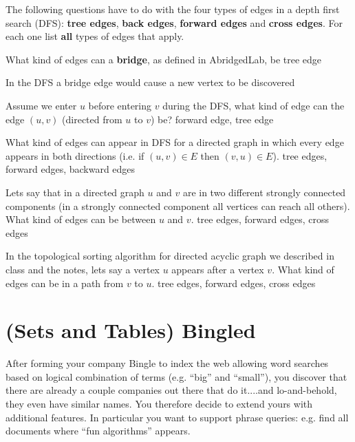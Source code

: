 \begin{problem}
%

The following questions have to do with the four types of edges in
a depth first search (DFS): \textbf{tree edges}, \textbf{back edges},
\textbf{forward edges} and \textbf{cross edges}.  For each one list
\textbf{all} types of edges that apply.


\ask[3.]
What kind of edges can a \textbf{bridge}, as defined in AbridgedLab, be
\sol
tree edge

\hint[0.7]
In the DFS a bridge edge would cause a new vertex to be discovered

\ask[3.]
Assume we enter $u$ before entering $v$ during the DFS, what kind of
edge can the edge $(u,v)$ (directed from $u$ to $v$) be?
\sol
forward edge, tree edge


\ask[3.]
What kind of edges can appear in DFS for a directed graph in which
every edge appears in both directions (i.e. if $(u,v) \in E$ then $(v,u)
\in E$).
\sol
tree edges, forward edges, backward edges


\ask[3.] Lets say that in a directed graph $u$ and $v$ are in two
different strongly connected components (in a strongly connected
component all vertices can reach all others).  What kind of edges can
be between $u$ and $v$.
\sol
tree edges, forward edges, cross edges

\ask[3.]
In the topological sorting algorithm for directed acyclic graph we
described in class and the notes, lets say a vertex $u$ appears
after a vertex $v$.  What kind of edges can be in a path
from $v$ to $u$.
\sol
tree edges, forward edges, cross edges

\end{problem}



\section{(Sets and Tables) Bingled}


%

After forming your company Bingle to index the web allowing word
searches based on logical combination of terms (e.g. ``big'' and
``small''), you discover that there are already a couple companies out
there that do it....and lo-and-behold, they even have similar names.
You therefore decide to extend yours with additional features.  In
particular you want to support phrase queries: e.g. find all
documents where ``fun algorithms'' appears.


